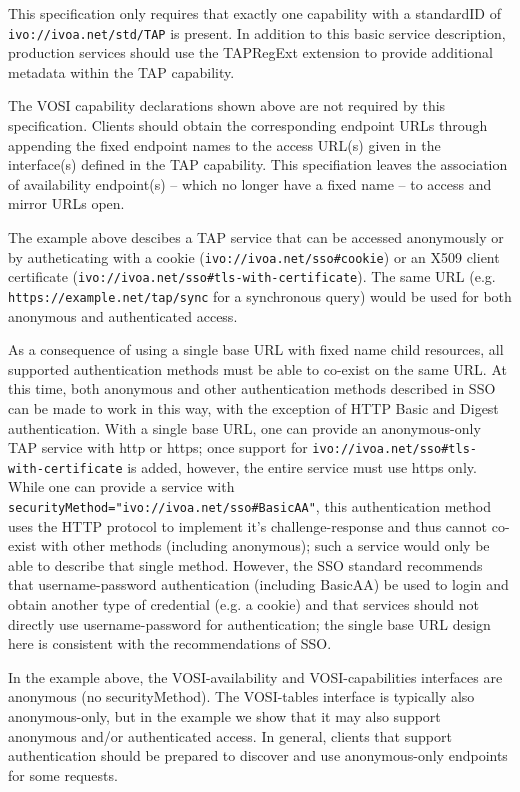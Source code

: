 \documentclass[11pt,letter]{ivoa}
\begin{document}
This specification only requires that exactly one capability with a
standardID of \nolinkurl{ivo://ivoa.net/std/TAP} is present.
In addition to this basic service description, production services
should use the TAPRegExt \citep{std:TAPREGEXT} extension to provide
additional metadata within the TAP capability.

The VOSI capability declarations shown above are not required by this
specification.  Clients should obtain the corresponding endpoint URLs through
appending the fixed endpoint names to the access URL(s) given in the
interface(s) defined in the TAP capability.  This specifiation leaves the
association of availability endpoint(s) -- which no longer have a fixed
name -- to access and mirror URLs open.

The example above descibes a TAP service that can be accessed anonymously or by autheticating with a cookie
(\verb|ivo://ivoa.net/sso#cookie|) or an X509 client certificate (\verb|ivo://ivoa.net/sso#tls-with-certificate|).
The same URL (e.g. \verb|https://example.net/tap/sync| for a synchronous query) would be used for both anonymous and authenticated access. 

As a consequence of using a single base URL with fixed name child resources, all supported authentication 
methods must be able to co-exist on the same URL. At this time, both anonymous and other authentication 
methods described in SSO can be made to work in this way, with the exception of HTTP Basic and Digest authentication. With a single base URL, one can provide an anonymous-only TAP service with http or https; once support for \verb|ivo://ivoa.net/sso#tls-with-certificate| is added, however, the entire service
must use https only. While one can provide a service with \verb|securityMethod="ivo://ivoa.net/sso#BasicAA"|, 
this authentication method uses the HTTP protocol to implement it's challenge-response and thus cannot co-exist with other methods (including anonymous); such a service would only be able to describe that single method. However, the SSO standard recommends that username-password authentication (including BasicAA) be used to login
and obtain another type of credential (e.g. a cookie) and that services should not directly use username-password
for authentication; the single base URL design here is consistent with the recommendations of SSO. 

In the example above, the VOSI-availability and VOSI-capabilities interfaces are anonymous (no securityMethod). 
The VOSI-tables interface is typically also anonymous-only, but in the example we show that it may also support
anonymous and/or authenticated access. In general, clients that support authentication should be prepared to discover and use anonymous-only endpoints for some requests. 
\end{document}
